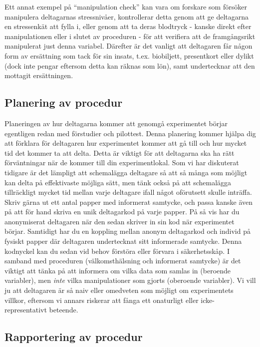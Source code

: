 \documentclass[
]{book}
\begin{document}
Ett annat exempel på ``manipulation check'' kan vara om forskare som försöker manipulera deltagarnas stressnivåer, kontrollerar detta genom att ge deltagarna en stressenkät att fylla i, eller genom att ta deras blodtryck - kanske direkt efter manipulationen eller i slutet av proceduren - för att verifiera att de framgångsrikt manipulerat just denna variabel. Därefter är det vanligt att deltagaren får någon form av ersättning som tack för sin insats, t.ex. biobiljett, presentkort eller dylikt (dock inte pengar eftersom detta kan räknas som lön), samt undertecknar att den mottagit ersättningen.

\hypertarget{sub07.6.8}{%
\subsection{Planering av procedur}\label{sub07.6.8}}

Planeringen av hur deltagarna kommer att genomgå experimentet börjar egentligen redan med förstudier och pilottest. Denna planering kommer hjälpa dig att förklara för deltagaren hur experimentet kommer att gå till och hur mycket tid det kommer ta att delta. Detta är viktigt för att deltagarna ska ha rätt förväntningar när de kommer till din experimentlokal. Som vi har diskuterat tidigare är det lämpligt att schemalägga deltagare så att så många som möjligt kan delta på effektivaste möjliga sätt, men tänk också på att schemalägga tillräckligt mycket tid mellan varje deltagare ifall något oförutsett skulle inträffa. Skriv gärna ut ett antal papper med informerat samtycke, och passa kanske även på att för hand skriva en unik deltagarkod på varje papper. På så vis har du anonymiserat deltagaren när den sedan skriver in sin kod när experimentet börjar. Samtidigt har du en koppling mellan anonym deltagarkod och individ på fysiskt papper där deltagaren undertecknat sitt informerade samtycke. Denna kodnyckel kan du sedan vid behov förstöra eller förvara i säkerhetsskåp. I samband med proceduren (välkomsthälsning och informerat samtycke) är det viktigt att tänka på att informera om vilka data som samlas in (beroende variabler), men \emph{inte} vilka manipulationer som gjorts (oberoende variabler). Vi vill ju att deltagaren är så naiv eller omedveten som möjligt om experimentets villkor, eftersom vi annars riskerar att fånga ett onaturligt eller icke-representativt beteende.

\hypertarget{sub07.6.9}{%
\subsection{Rapportering av procedur}\label{sub07.6.9}}
\end{document}
